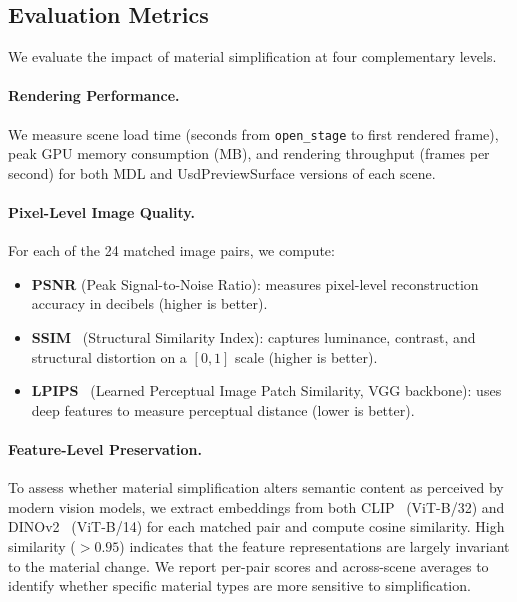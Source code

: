 \subsection{Evaluation Metrics}
\label{sec:metrics}

We evaluate the impact of material simplification at four complementary levels.

\paragraph{Rendering Performance.}
We measure scene load time (seconds from \texttt{open\_stage} to first rendered
frame), peak GPU memory consumption (MB), and rendering throughput (frames per
second) for both MDL and UsdPreviewSurface versions of each scene.

\paragraph{Pixel-Level Image Quality.}
For each of the 24 matched image pairs, we compute:
\begin{itemize}
    \item \textbf{PSNR} (Peak Signal-to-Noise Ratio): measures pixel-level
    reconstruction accuracy in decibels (higher is better).
    \item \textbf{SSIM}~\cite{Wang2004Image} (Structural Similarity Index):
    captures luminance, contrast, and structural distortion on a $[0,1]$ scale
    (higher is better).
    \item \textbf{LPIPS}~\cite{Zhang2018Unreasonable} (Learned Perceptual
    Image Patch Similarity, VGG backbone): uses deep features to measure
    perceptual distance (lower is better).
\end{itemize}

\paragraph{Feature-Level Preservation.}
To assess whether material simplification alters semantic content as perceived
by modern vision models, we extract embeddings from both
CLIP~\cite{Radford2021Learning} (ViT-B/32) and
DINOv2~\cite{Oquab2023DINOv2} (ViT-B/14) for each matched pair and compute
cosine similarity. High similarity ($> 0.95$) indicates that the feature
representations are largely invariant to the material change. We report
per-pair scores and across-scene averages to identify whether specific material
types are more sensitive to simplification.


